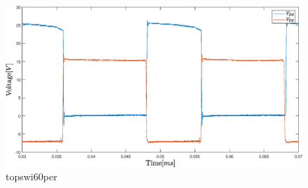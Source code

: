 \begin{figure}[H]
	\begin{center}
   \includegraphics[width=\textwidth]{figures/06Testing/topswi60per.eps}
	\end{center}
	\vspace{-8mm}
	\caption{topswi60per}
	\label{fig:V_OUT_ALL}
\end{figure}
